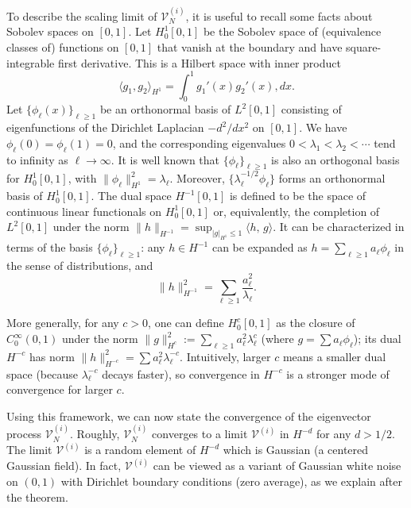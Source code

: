 \documentclass[11pt, reqno]{amsart}
\numberwithin{equation}{section}
\begin{document}
To describe the scaling limit of $\mathcal V_N^{(i)}$, it is useful to recall some facts about Sobolev spaces on $[0,1]$. Let $H^1_0[0,1]$ be the Sobolev space of (equivalence classes of) functions on $[0,1]$ that vanish at the boundary and have square-integrable first derivative. This is a Hilbert space with inner product $$\langle g_1,g_2\rangle_{H^1} = \int_0^1 g_1'(x) g_2'(x),dx.$$ Let $\{\phi_\ell(x)\}_{\ell\ge1}$ be an orthonormal basis of $L^2[0,1]$ consisting of eigenfunctions of the Dirichlet Laplacian $-d^2/dx^2$ on $[0,1]$. We have $\phi_\ell(0)=\phi_\ell(1)=0$, and the corresponding eigenvalues $0<\lambda_1 < \lambda_2 < \cdots$ tend to infinity as $\ell\to\infty$. It is well known that $\{\phi_\ell\}_{\ell\ge 1}$ is also an orthogonal basis for $H^1_0[0,1]$, with $\|\phi_\ell\|_{H^1}^2 = \lambda_{\ell}$. Moreover, $\{\lambda_\ell^{-1/2}\phi_\ell\}$ forms an orthonormal basis of $H^1_0[0,1]$. The dual space $H^{-1}[0,1]$ is defined to be the space of continuous linear functionals on $H^1_0[0,1]$ or, equivalently, the completion of $L^2[0,1]$ under the norm $\|h\|_{H^{-1}} = \sup_{|g|_{H^1}\le1} \langle h,\, g\rangle$. It can be characterized in terms of the basis $\{\phi_{\ell}\}_{\ell\ge 1}$: any $h\in H^{-1}$ can be expanded as $h = \sum_{\ell \ge 1} a_\ell \phi_\ell$ in the sense of distributions, and
\[
\|h\|_{H^{-1}}^2=\sum_{\ell \geq 1} \frac{a_{\ell}^2}{\lambda_{\ell}}.
\]

More generally, for any $c>0$, one can define $H^c_0[0,1]$ as the closure of $C_0^\infty(0,1)$ under the norm $\|g\|_{H^c}^2 := \sum_{\ell\ge1} a_\ell^2 \lambda_\ell^c$ (where $g = \sum a_\ell \phi_\ell$); its dual $H^{-c}$ has norm $\|h\|_{H^{-c}}^2 = \sum a_\ell^2 \lambda_{\ell}^{-c}$. Intuitively, larger $c$ means a smaller dual space (because $\lambda_\ell^{-c}$ decays faster), so convergence in $H^{-c}$ is a stronger mode of convergence for larger $c$.

Using this framework, we can now state the convergence of the eigenvector process $\mathcal V_N^{(i)}$. Roughly, $\mathcal V_N^{(i)}$ converges to a limit $\mathcal V^{(i)}$ in $H^{-d}$ for any $d>1/2$. The limit $\mathcal V^{(i)}$ is a random element of $H^{-d}$ which is Gaussian (a centered Gaussian field). In fact, $\mathcal V^{(i)}$ can be viewed as a variant of Gaussian white noise on $(0,1)$ with Dirichlet boundary conditions (zero average), as we explain after the theorem.
\end{document}
